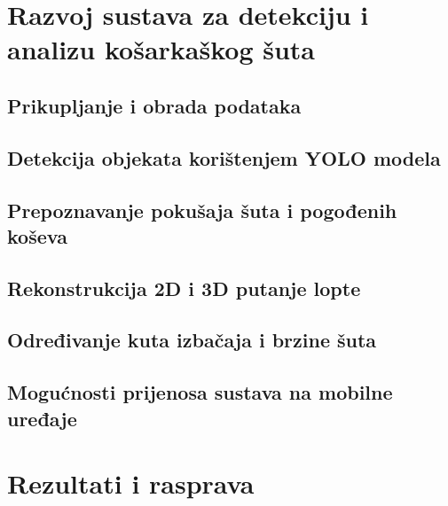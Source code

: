 \documentclass[zavrsnirad]{fer}
\begin{document}
\chapter{Razvoj sustava za detekciju i analizu košarkaškog šuta}
\label{pog:razvoj_sustava_za_detekciju_i_analizu_kosarkaskog_suta}

\section{Prikupljanje i obrada podataka}
\label{pog:prikupljanje_i_obrada_podataka}

\section{Detekcija objekata korištenjem YOLO modela}
\label{pog:detekcija_objekata_koristenjem_yolo_modela}


\section{Prepoznavanje pokušaja šuta i pogođenih koševa}
\label{pog:prepoznavanje_pokusaja_suta_i_pogodenih_koseva}

\section{Rekonstrukcija 2D i 3D putanje lopte}
\label{pog:rekonstrukcija_2d_i_3d_putanje_lopte}

\section{Određivanje kuta izbačaja i brzine šuta}
\label{pog:odredivanje_kuta_izbacaja_i_brzine_suta}


\section{Mogućnosti prijenosa sustava na mobilne uređaje}
\label{pog:mogucnosti_prijenosa_sustava_na_mobilne_uredaje}


\chapter{Rezultati i rasprava}
\label{pog:rezultati_i_rasprava}
\end{document}
